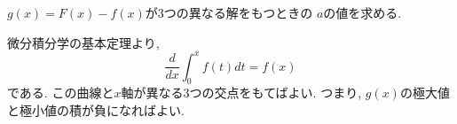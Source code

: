 \documentclass[a4j, 11pt]{jarticle}
\begin{document}
 
 $g(x) = F(x) - f(x)$が3つの異なる解をもつときの $a$の値を求める. \par
 微分積分学の基本定理より, 
 \begin{equation*}
  \frac{d}{dx}\int_{0}^{x} f(t) dt =  f(x)
 \end{equation*}である. 
 この曲線と$x$軸が異なる3つの交点をもてばよい. 
 つまり, $g(x)$の極大値と極小値の積が負になればよい. 
\end{document}
